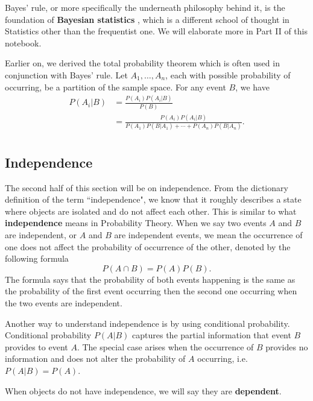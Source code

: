 \documentclass[11pt, a4paper, oneside]{book}
\theoremstyle{definition}
\begin{document}
\noindent Bayes' rule, or more specifically the underneath philosophy behind it, is the foundation of \textbf{Bayesian statistics} , which is a different school of thought in Statistics other than the frequentist one. We will elaborate more in Part II of this notebook. 

\noindent Earlier on, we derived the total probability theorem which is often used in conjunction with Bayes' rule. Let $A_1, \dots, A_n$, each with possible probability of occurring, be a partition of the sample space. For any event $B$, we have
\begin{equation*}
\begin{split}
P(A_i | B) &= \frac{P(A_i)P(A_i | B)}{P(B)} \\
&= \frac{P(A_i)P(A_i | B)}{P(A_1)P(B|A_1) + \cdots + P(A_n)P(B|A_n)}. \\
\end{split}
\end{equation*}

\subsection{Independence}

\noindent The second half of this section will be on independence. From the dictionary definition of the term ``independence", we know that it roughly describes a state where objects are isolated and do not affect each other. This is similar to what \textbf{independence} means in Probability Theory. When we say two events $A$ and $B$ are independent, or $A$ and $B$ are independent events, we mean the occurrence of one does not affect the probability of occurrence of the other, denoted by the following formula \[
P(A \cap B) = P(A)P(B).
\]
The formula says that the probability of both events happening is the same as the probability of the first event occurring then the second one occurring when the two events are independent. 

\noindent Another way to understand independence is by using conditional probability. Conditional probability $P(A|B)$ captures the partial information that event $B$ provides to event $A$. The special case arises when the occurrence of $B$ provides no information and does not alter the probability of $A$ occurring, i.e. $P(A|B) = P(A)$. 

\noindent When objects do not have independence, we will say they are \textbf{dependent}.
\end{document}

